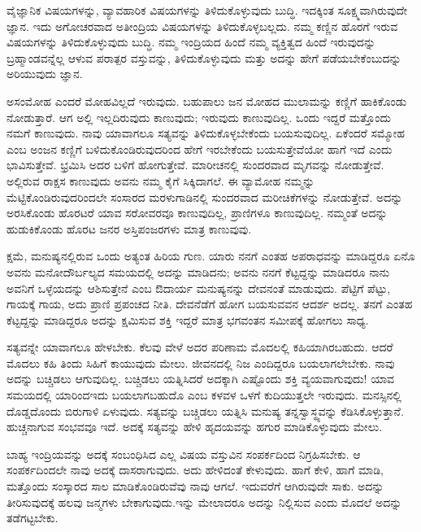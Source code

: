 \newpage

ವೈಜ್ಞಾನಿಕ ವಿಷಯಗಳನ್ನು, ವ್ಯಾವಹಾರಿಕ ವಿಷಯಗಳನ್ನು ತಿಳಿದುಕೊಳ್ಳುವುದು ಬುದ್ಧಿ. ಇದಕ್ಕಿಂತ ಸೂಕ್ಷ್ಮವಾಗಿರುವುದೇ ಜ್ಞಾನ. ಇದು ಅಗೋಚರವಾದ ಅತೀಂದ್ರಿಯ ವಿಷಯಗಳನ್ನು ತಿಳಿದುಕೊಳ್ಳಬಲ್ಲದು. ನಮ್ಮ ಕಣ್ಣಿನ ಹೊರಗೆ ಇರುವ ವಿಷಯಗಳನ್ನು ತಿಳಿದುಕೊಳ್ಳುವುದು ಬುದ್ಧಿ. ನಮ್ಮ ಇಂದ್ರಿಯದ ಹಿಂದೆ ನಮ್ಮ ವ್ಯಕ್ತಿತ್ವದ ಹಿಂದೆ ಇರುವುದನ್ನು ಬ್ರಹ್ಮಾಂಡವನ್ನೆಲ್ಲ ಆಳುವ ಪರಾತ್ಪರ ವಸ್ತುವನ್ನು, ತಿಳಿದುಕೊಳ್ಳುವುದು ಮತ್ತು ಅದನ್ನು ಹೇಗೆ ಪಡೆಯಬೇಕೆಂಬುದನ್ನು ಅರಿಯುವುದು ಜ್ಞಾನ.

ಅಸಂಮೋಹ ಎಂದರೆ ಮೋಹವಿಲ್ಲದೆ ಇರುವುದು. ಬಹುಪಾಲು ಜನ ಮೋಹದ ಮುಲಾ\-ಮನ್ನು ಕಣ್ಣಿಗೆ ಹಾಕಿಕೊಂಡು ನೋಡುತ್ತಾರೆ. ಆಗ ಅಲ್ಲಿ ಇಲ್ಲದಿರುವುದು ಕಾಣುವುದು; ಇರುವುದು ಕಾಣುವುದಿಲ್ಲ. ಒಂದು ಇದ್ದರೆ ಮತ್ತೊಂದು ನಮಗೆ ಕಾಣುವುದು. ನಾವು ಯಾವಾಗಲೂ ಸತ್ಯವನ್ನು ತಿಳಿದುಕೊಳ್ಳಬೇಕೆಂದು ಬಯಸುವುದಿಲ್ಲ. ಏಕೆಂದರೆ ಸಮ್ಮೋಹ ಎಂಬ ಅಂಜನ ಕಣ್ಣಿಗೆ ಬಳಿದುಕೊಂಡಿರುವುದರಿಂದ ಹೇಗೆ ಇರಬೇಕೆಂದು ಬಯಸುತ್ತೇವೆಯೋ ಹಾಗೆ ಇದೆ ಎಂದು ಭಾವಿಸುತ್ತೇವೆ. ಭ್ರಮಿಸಿ ಅದರ ಬಳಿಗೆ ಹೋಗುತ್ತೇವೆ. ಮಾರೀಚನಲ್ಲಿ ಸುಂದರವಾದ ಮೃಗವನ್ನು ನೋಡುತ್ತೇವೆ. ಅಲ್ಲಿರುವ ರಾಕ್ಷಸ ಕಾಣುವುದು ಅವನು ನಮ್ಮ ಕೈಗೆ ಸಿಕ್ಕಿದಾಗಲೆ. ಈ ವ್ಯಾಮೋಹ ನಮ್ಮನ್ನು ಮೆಟ್ಟಿಕೊಂಡಿರುವುದರಿಂದಲೇ ಸಂಸಾರದ ಮರಳುಗಾಡಿನಲ್ಲಿ ಸುಂದರವಾದ ಮರೀಚಿಕೆಗಳನ್ನು ನೋಡುತ್ತೇವೆ. ಅದನ್ನು ಅರಸಿಕೊಂಡು ಹೊರಟರೆ ಯಾವ ಸರೋವರವೂ ಕಾಣುವುದಿಲ್ಲ, ಪ್ರಾಣಿಗಳೂ ಕಾಣುವುದಿಲ್ಲ. ನಮ್ಮಂತೆ ಅದನ್ನು ಹುಡುಕಿಕೊಂಡು ಹೊರಟ ಜನರ ಅಸ್ತಿಪಂಜರಗಳು ಮಾತ್ರ ಕಾಣುವುವು.

ಕ್ಷಮೆ, ಮನುಷ್ಯನಲ್ಲಿರುವ ಒಂದು ಅತ್ಯಂತ ಹಿರಿಯ ಗುಣ. ಯಾರು ನನಗೆ ಎಂತಹ ಅಪರಾಧವನ್ನು ಮಾಡಿದ್ದರೂ ಏನೊ ಅವನು ಮನೋದೌರ್ಬಲ್ಯದ ಸಮಯದಲ್ಲಿ ಅದನ್ನು ಮಾಡಿದನು; ಅವನು ನನಗೆ ಕೆಟ್ಟದ್ದನ್ನು ಮಾಡಿದರೂ ನಾನು ಅವನಿಗೆ ಒಳ್ಳೆಯದನ್ನು ಆಶಿಸುತ್ತೇನೆ ಎಂಬ ಔದಾರ್ಯ ಮನುಷ್ಯನನ್ನು ದೇವನಂತೆ ಮಾಡುವುದು. ಪೆಟ್ಟಿಗೆ ಪೆಟ್ಟು, ಗಾಯಕ್ಕೆ ಗಾಯ, ಅದು ಪ್ರಾಣಿ ಪ್ರಪಂಚದ ನೀತಿ. ದೇವನೆಡೆಗೆ ಹೋಗ ಬಯಸುವವನ ಆದರ್ಶ ಅದಲ್ಲ. ತನಗೆ ಎಂತಹ ಕೆಟ್ಟದ್ದನ್ನು ಮಾಡಿದ್ದರೂ ಅದನ್ನು ಕ್ಷಮಿಸುವ ಶಕ್ತಿ ಇದ್ದರೆ ಮಾತ್ರ ಭಗವಂತನ ಸಮೀಪಕ್ಕೆ ಹೋಗಲು ಸಾಧ್ಯ.

ಸತ್ಯವನ್ನೇ ಯಾವಾಗಲೂ ಹೇಳಬೇಕು. ಕೆಲವು ವೇಳೆ ಅದರ ಪರಿಣಾಮ ಮೊದಲಲ್ಲಿ ಕಹಿಯಾಗಿರಬಹುದು. ಆದರೆ ಮೊದಲು ಕಹಿ ತಿಂದು ಸಿಹಿಗೆ ಕಾಯುವುದು ಮೇಲು. ಜೀವನದಲ್ಲಿ ನಿಜ ಎಂದಿದ್ದರೂ ಬಯಲಾಗಲೇಬೇಕು. ನಾವು ಅದನ್ನು ಬಚ್ಚಿಡಲು ಆಗುವುದಿಲ್ಲ. ಬಚ್ಚಿಡಲು ಯತ್ನಿಸಿದರೆ ಅದಕ್ಕಾಗಿ ಎಷ್ಟೊಂದು ಶಕ್ತಿ ವ್ಯಯವಾಗುವುದು! ಯಾವ ಸಮಯದಲ್ಲಿ ಯಾರಿಂದ\break ಇದು ಬಯಲಾಗಬಹುದೊ ಎಂಬ ಕಳವಳ ಒಳಗೆ ಕುದಿಯುತ್ತಲೇ ಇರುವುದು. ಮನಸ್ಸಿನಲ್ಲಿ ದೊಡ್ಡದೊಂದು ಬಿರುಗಾಳಿ ಏಳುವುದು. ಸತ್ಯವನ್ನು ಬಚ್ಚಿಡಲು ಯತ್ನಿಸಿ ಮನುಷ್ಯ ತನ್ನ\break ಸ್ವಾಸ್ಥ್ಯವನ್ನು ಕೆಡಿಸಿಕೊಳ್ಳುತ್ತಾನೆ. ಹುಚ್ಚನಾಗುವ ಸಂಭವವೂ ಇದೆ. ಅದಕ್ಕೆ ಸತ್ಯವನ್ನು ಹೇಳಿ ಹೃದಯವನ್ನು ಹಗುರ ಮಾಡಿಕೊಳ್ಳುವುದು ಮೇಲು.

ಬಾಹ್ಯ ಇಂದ್ರಿಯವನ್ನು ಅದಕ್ಕೆ ಸಂಬಂಧಿಸಿದ ಎಲ್ಲ ವಿಷಯ ವಸ್ತುವಿನ ಸಂಪರ್ಕದಿಂದ ನಿಗ್ರಹಿಸಬೇಕು. ಆ ಸಂಪರ್ಕದಿಂದಲೇ ನಾವು ಅದಕ್ಕೆ ದಾಸರಾಗುವುದು. ಅದು ಹೇಳಿದಂತೆ ಕೇಳುವುದು. ಹಾಗೆ ಕೇಳಿ, ಹಾಗೆ ಮಾಡಿ, ಮತ್ತೊಂದು ಸಂಸ್ಕಾರದ ಸಾಲ ಮಾಡಿಕೊಂಡಿರುವೆವು ನಾವು ಆಗಲೆ. ಇದುವರೆಗೆ ಆಗಿರುವುದೇ ಸಾಕು. ಅದನ್ನು ತೀರಿಸುವುದಕ್ಕೆ ಹಲವು ಜನ್ಮಗಳು ಬೇಕಾಗುವುದು.ಇನ್ನು ಮೇಲಾದರೂ ಅದನ್ನು ನಿಲ್ಲಿಸುವ ಎಂದು ಮೊದಲೆ ಅದನ್ನು ತಡೆಗಟ್ಟಬೇಕು.

